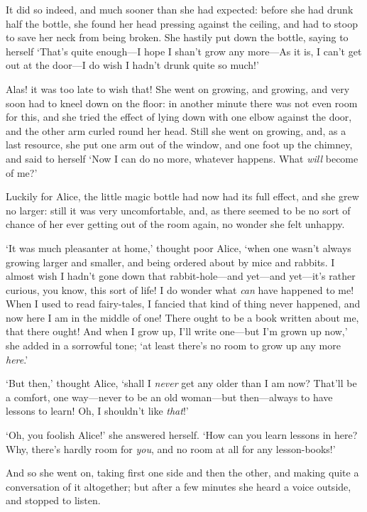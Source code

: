 \documentclass[12pt,openany]{memoir}
\begin{document}
It did so indeed, and much sooner than she had expected: before she had drunk half the bottle, she found her head pressing against the ceiling, and had to stoop to save her neck from being broken. She hastily put down the bottle, saying to herself `That's quite enough---I hope I shan't grow any more---As it is, I can't get out at the door---I do wish I hadn't drunk quite so much!'

Alas! it was too late to wish that! She went on growing, and growing, and very soon had to kneel down on the floor: in another minute there was not even room for this, and she tried the effect of lying down with one elbow against the door, and the other arm curled round her head. Still she went on growing, and, as a last resource, she put one arm out of the window, and one foot up the chimney, and said to herself `Now I can do no more, whatever happens. What \textit{will} become of me?'

Luckily for Alice, the little magic bottle had now had its full effect, and she grew no larger: still it was very uncomfortable, and, as there seemed to be no sort of chance of her ever getting out of the room again, no wonder she felt unhappy.

`It was much pleasanter at home,' thought poor Alice, `when one wasn't always growing larger and smaller, and being ordered about by mice and rabbits. I almost wish I hadn't gone down that rabbit-hole---and yet---and yet---it's rather curious, you know, this sort of life! I do wonder what \textit{can} have happened to me! When I used to read fairy-tales, I fancied that kind of thing never happened, and now here I am in the middle of one! There ought to be a book written about me, that there ought! And when I grow up, I'll write one---but I'm grown up now,' she added in a sorrowful tone; `at least there's no room to grow up any more \textit{here}.'

`But then,' thought Alice, `shall I \textit{never} get any older than I am now? That'll be a comfort, one way---never to be an old woman---but then---always to have lessons to learn! Oh, I shouldn't like \textit{that}!'

`Oh, you foolish Alice!' she answered herself. `How can you learn lessons in here? Why, there's hardly room for \textit{you}, and no room at all for any lesson-books!'

And so she went on, taking first one side and then the other, and making quite a conversation of it altogether; but after a few minutes she heard a voice outside, and stopped to listen.
\end{document}
